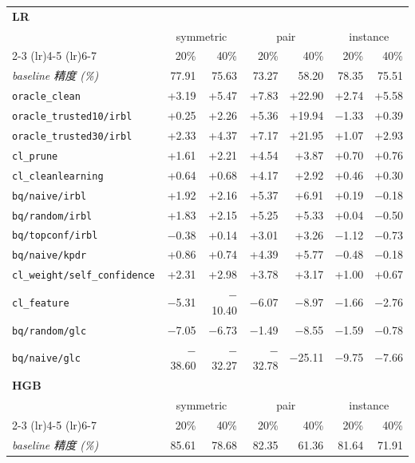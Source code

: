 \begin{tabular}{lrrrrrr}
\toprule
\multicolumn{7}{l}{\textbf{LR}} \\
 & \multicolumn{2}{c}{symmetric} & \multicolumn{2}{c}{pair} & \multicolumn{2}{c}{instance} \\
\cmidrule(lr){2-3} \cmidrule(lr){4-5} \cmidrule(lr){6-7}
 & 20\% & 40\% & 20\% & 40\% & 20\% & 40\% \\
\midrule
\textit{baseline 精度 (\%)} & 77.91 & 75.63 & 73.27 & 58.20 & 78.35 & 75.51 \\
\addlinespace
\texttt{oracle\_clean} & +3.19 & +5.47 & +7.83 & +22.90 & +2.74 & +5.58 \\
\texttt{oracle\_trusted10/irbl} & +0.25 & +2.26 & +5.36 & +19.94 & $-$1.33 & +0.39 \\
\texttt{oracle\_trusted30/irbl} & +2.33 & +4.37 & +7.17 & +21.95 & +1.07 & +2.93 \\
\texttt{cl\_prune} & +1.61 & +2.21 & +4.54 & +3.87 & +0.70 & +0.76 \\
\texttt{cl\_cleanlearning} & +0.64 & +0.68 & +4.17 & +2.92 & +0.46 & +0.30 \\
\texttt{bq/naive/irbl} & +1.92 & +2.16 & +5.37 & +6.91 & +0.19 & $-$0.18 \\
\texttt{bq/random/irbl} & +1.83 & +2.15 & +5.25 & +5.33 & +0.04 & $-$0.50 \\
\texttt{bq/topconf/irbl} & $-$0.38 & +0.14 & +3.01 & +3.26 & $-$1.12 & $-$0.73 \\
\texttt{bq/naive/kpdr} & +0.86 & +0.74 & +4.39 & +5.77 & $-$0.48 & $-$0.18 \\
\texttt{cl\_weight/self\_confidence} & +2.31 & +2.98 & +3.78 & +3.17 & +1.00 & +0.67 \\
\texttt{cl\_feature} & $-$5.31 & $-$10.40 & $-$6.07 & $-$8.97 & $-$1.66 & $-$2.76 \\
\texttt{bq/random/glc} & $-$7.05 & $-$6.73 & $-$1.49 & $-$8.55 & $-$1.59 & $-$0.78 \\
\texttt{bq/naive/glc} & $-$38.60 & $-$32.27 & $-$32.78 & $-$25.11 & $-$9.75 & $-$7.66 \\
\midrule
\multicolumn{7}{l}{\textbf{HGB}} \\
 & \multicolumn{2}{c}{symmetric} & \multicolumn{2}{c}{pair} & \multicolumn{2}{c}{instance} \\
\cmidrule(lr){2-3} \cmidrule(lr){4-5} \cmidrule(lr){6-7}
 & 20\% & 40\% & 20\% & 40\% & 20\% & 40\% \\
\midrule
\textit{baseline 精度 (\%)} & 85.61 & 78.68 & 82.35 & 61.36 & 81.64 & 71.91 \\

\end{tabular}
